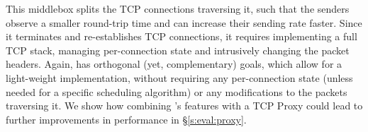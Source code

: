  This middlebox splits the TCP connections traversing it, such that the senders observe a smaller round-trip time and can increase their sending rate faster. Since it terminates and re-establishes TCP connections, it requires implementing a full TCP stack, managing per-connection state and intrusively changing the packet headers. Again, \name has orthogonal (yet, complementary) goals, which allow for a light-weight implementation, without requiring any per-connection state (unless needed for a specific scheduling algorithm) or any modifications to the packets traversing it. We show how combining \name's features with a TCP Proxy could lead to further improvements in performance in \S\ref{s:eval:proxy}. 


